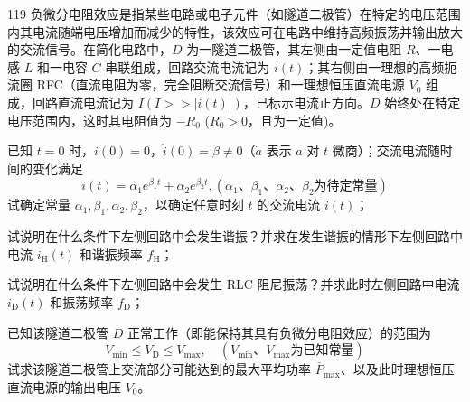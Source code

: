 \begin{problem}[2020第37届全国中学生物理竞赛复赛][隧道二极管负阻振荡电路分析]{119}
    负微分电阻效应是指某些电路或电子元件（如隧道二极管）在特定的电压范围内其电流随端电压增加而减少的特性，该效应可在电路中维持高频振荡并输出放大的交流信号。在简化电路中，$D$ 为一隧道二极管，其左侧由一定值电阻 $R$、一电感 $L$ 和一电容 $C$ 串联组成，回路交流电流记为 $i(t)$；其右侧由一理想的高频扼流圈 RFC（直流电阻为零，完全阻断交流信号）和一理想恒压直流电源 $V_{0}$ 组成，回路直流电流记为 $I (I >> |i(t)|)$，已标示电流正方向。$D$ 始终处在特定电压范围内，这时其电阻值为 $-R_{0}$ ($R_{0} > 0$，且为一定值)。
    \begin{subproblem}
        已知 $t = 0$ 时，$i(0) = 0$，$\dot{i}(0) = \beta \neq 0$（$\dot{a}$ 表示 $a$ 对 $t$ 微商）；交流电流随时间的变化满足
        \begin{equation}
            i(t) = \alpha_{1} e^{\beta_{1} t} + \alpha_{2} e^{\beta_{2} t}, (\alpha_{1} 、 \beta_{1} 、 \alpha_{2} 、 \beta_{2} \text{为待定常量})
        \end{equation}
        试确定常量 $\alpha_{1}, \beta_{1}, \alpha_{2}, \beta_{2}$，以确定任意时刻 $t$ 的交流电流 $i(t)$；
    \end{subproblem}
    \begin{subproblem}
        试说明在什么条件下左侧回路中会发生谐振？并求在发生谐振的情形下左侧回路中电流 $i_{\mathrm{H}}(t)$ 和谐振频率 $f_{\mathrm{H}}$；
    \end{subproblem}
    \begin{subproblem}
        试说明在什么条件下左侧回路中会发生 RLC 阻尼振荡？并求此时左侧回路中电流 $i_{\mathrm{D}}(t)$ 和振荡频率 $f_{\mathrm{D}}$；
    \end{subproblem}
    \begin{subproblem}
        已知该隧道二极管 $D$ 正常工作（即能保持其具有负微分电阻效应）的范围为
        \begin{equation}
            V_{\min} \leq V_{\mathrm{D}} \leq V_{\max}, \quad (V_{\min} 、 V_{\max} \text{为已知常量})
        \end{equation}
        试求该隧道二极管上交流部分可能达到的最大平均功率 $\overline{P}_{\mathrm{max}}$、以及此时理想恒压直流电源的输出电压 $V_{0}$。
    \end{subproblem}
\end{problem}